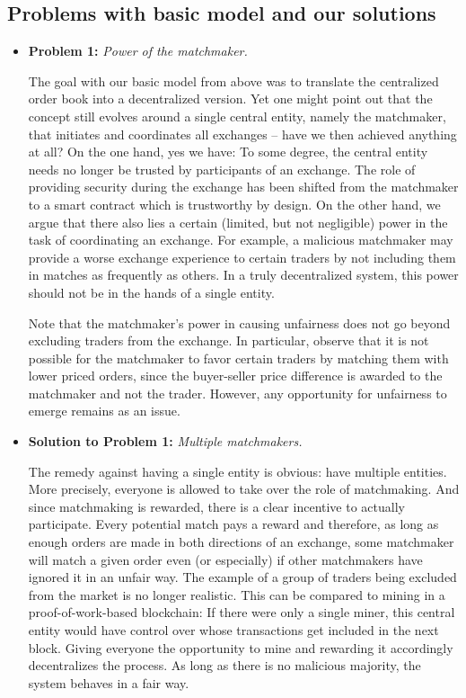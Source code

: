 \documentclass[11pt]{article}
\begin{document}
\subsection{Problems with basic model and our solutions}
\begin{itemize}
    \item \textbf{Problem 1:} \emph{Power of the matchmaker.}
    
    The goal with our basic model from above was to translate the centralized order book into a decentralized version. Yet one might point out that the concept still evolves around a single central entity, namely the matchmaker, that initiates and coordinates all exchanges -- have we then achieved anything at all? On the one hand, yes we have: To some degree, the central entity needs no longer be trusted by participants of an exchange. The role of providing security during the exchange has been shifted from the matchmaker to a smart contract which is trustworthy by design. On the other hand, we argue that there also lies a certain (limited, but not negligible) power in the task of coordinating an exchange. For example, a malicious matchmaker may provide a worse exchange experience to certain traders by not including them in matches as frequently as others. In a truly decentralized system, this power should not be in the hands of a single entity.\cite{matchmaker-power}
    
    Note that the matchmaker's power in causing unfairness does not go beyond excluding traders from the exchange. In particular, observe that it is not possible for the matchmaker to favor certain traders by matching them with lower priced orders, since the buyer-seller price difference is awarded to the matchmaker and not the trader.
    However, any opportunity for unfairness to emerge remains as an issue.
    
    \item \textbf{Solution to Problem 1:} \emph{Multiple matchmakers.}
    
    The remedy against having a single entity is obvious: have multiple entities. More precisely, everyone is allowed to take over the role of matchmaking. And since matchmaking is rewarded, there is a clear incentive to actually participate. Every potential match pays a reward and therefore, as long as enough orders are made in both directions of an exchange, some matchmaker will match a given order even (or especially) if other matchmakers have ignored it in an unfair way. The example of a group of traders being excluded from the market is no longer realistic. This can be compared to mining in a proof-of-work-based blockchain: If there were only a single miner, this central entity would have control over whose transactions get included in the next block. Giving everyone the opportunity to mine and rewarding it accordingly decentralizes the process. As long as there is no malicious majority, the system behaves in a fair way.
    

\end{itemize}
\end{document}
